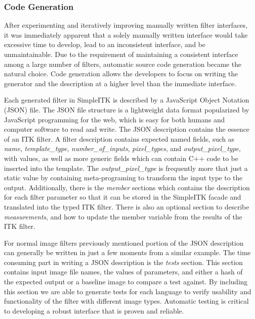 \documentclass{frontiersMED} %
\begin{document}
\subsubsection{Code Generation}
After experimenting and iteratively improving manually written filter
interfaces, it was immediately apparent that a solely manually written
interface would take excessive time to develop, lead to an
inconsistent interface, and be unmaintainable. Due to the requirement
of maintaining a consistent interface among a large number of filters,
automatic source code generation became the natural choice. Code
generation allows the developers to focus on writing the generator and
the description at a higher level than the immediate interface.

Each generated filter in SimpleITK is described by a JavaScript Object
Notation (JSON) file. The JSON file structure is a lightweight data
format popularized by JavaScript programming for the web, which is
easy for both humans and computer software to read and write. The JSON
description contains the essence of an ITK filter. A filter
description contains expected named fields, such as \textit{name},
\textit{template\_type}, \textit{number\_of\_inputs},
\textit{pixel\_types}, and \textit{output\_pixel\_type}, with
values, as well as more generic fields which can contain C++ code to
be inserted into the template. The \textit{output\_pixel\_type} is
frequently more that just a static value by containing meta-programing
to transform the input type to the output. Additionally, there is the
\textit{member} sections which contains the description for each filter
parameter so that it can be stored in the SimpleITK facade and
translated into the typed ITK filter. There is also an optional
section to describe \textit{measurements}, and how to update the member
variable from the results of the ITK filter.

For normal image filters previously mentioned portion of the JSON
description can generally be written in just a few moments from a
similar example. The time consuming part in writing a JSON description
is the \textit{tests} section. This section contains input image file names,
the values of parameters, and either a hash of the expected output or
a baseline image to compare a test against. By including this section
we are able to generate tests for each language to verify usability
and functionality of the filter with different image types. Automatic
testing is critical to developing a robust interface that is proven
and reliable.
\end{document}
